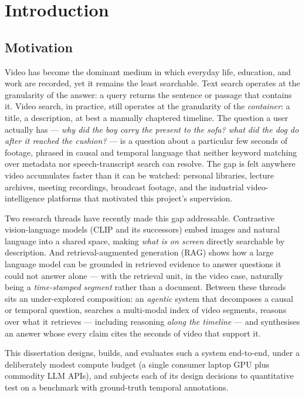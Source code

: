 \chapter{Introduction}

\section{Motivation}

Video has become the dominant medium in which everyday life, education,
and work are recorded, yet it remains the least searchable. Text search
operates at the granularity of the answer: a query returns the sentence
or passage that contains it. Video search, in practice, still operates
at the granularity of the \emph{container}: a title, a description, at
best a manually chaptered timeline. The question a user actually has ---
\emph{why did the boy carry the present to the sofa? what did the dog do
after it reached the cushion?} --- is a question about a particular few
seconds of footage, phrased in causal and temporal language that neither
keyword matching over metadata nor speech-transcript search can resolve.
The gap is felt anywhere video accumulates faster than it can be
watched: personal libraries, lecture archives, meeting recordings,
broadcast footage, and the industrial video-intelligence platforms that
motivated this project's supervision.

Two research threads have recently made this gap addressable.
Contrastive vision-language models (CLIP and its successors) embed
images and natural language into a shared space, making \emph{what is on
screen} directly searchable by description. And retrieval-augmented
generation (RAG) shows how a large language model can be grounded in
retrieved evidence to answer questions it could not answer alone ---
with the retrieval unit, in the video case, naturally being a
\emph{time-stamped segment} rather than a document. Between these
threads sits an under-explored composition: an \emph{agentic} system
that decomposes a causal or temporal question, searches a multi-modal
index of video segments, reasons over what it retrieves --- including
reasoning \emph{along the timeline} --- and synthesises an answer whose
every claim cites the seconds of video that support it.

This dissertation designs, builds, and evaluates such a system
end-to-end, under a deliberately modest compute budget (a single
consumer laptop GPU plus commodity LLM APIs), and subjects each of its
design decisions to quantitative test on a benchmark with ground-truth
temporal annotations.

